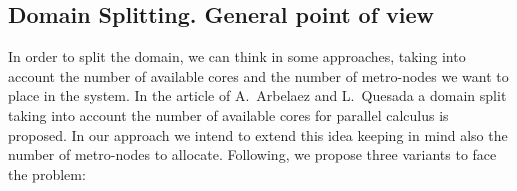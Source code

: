 \subsection{Domain Splitting. General point of view}

In order to split the domain, we can think in some approaches, taking into account the number of available cores and the number of metro-nodes we want to place in the system. In the article of A.~Arbelaez and L.~Quesada a domain split taking into account the number of available cores for parallel calculus is proposed. In our approach we intend to extend this idea keeping in mind also the number of metro-nodes to allocate. Following, we propose three variants to face the problem:


